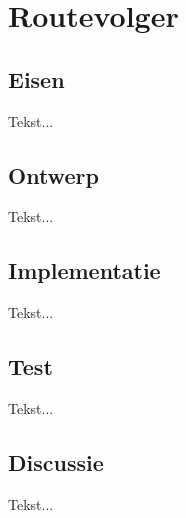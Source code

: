 \chapter[Routevolger]{Routevolger} \label {chapter:routevolger}

	\section{Eisen}
		Tekst...
	\section{Ontwerp}
		Tekst...
	\section{Implementatie}
			Tekst...
	\section{Test}
			Tekst...
	\section{Discussie}
			Tekst...
